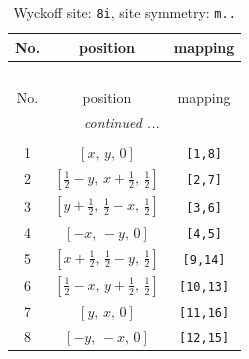 \documentclass[fleqn,8pt]{jsarticle}
\begin{document}
\renewcommand{\arraystretch}{1.2}
\begin{longtable}{ccc}
\caption{Wyckoff site: {\tt 8i}, site symmetry: {\tt m..}}
 \\
 \hline \hline
No. & position & mapping \\ \hline \endfirsthead

\multicolumn{2}{l}{\tablename\ \thetable{}} \\
 \hline \hline
No. & position & mapping \\ \hline \endhead

 \hline \hline
\multicolumn{2}{r}{\footnotesize\it continued ...} \\ \endfoot

 \hline \hline
\multicolumn{2}{r}{} \\ \endlastfoot

1 & $\left[ x,\, y,\, 0 \right]$ & {\tt [1,8]} \\ \hline
2 & $\left[ \frac{1}{2} - y,\, x + \frac{1}{2},\, \frac{1}{2} \right]$ & {\tt [2,7]} \\ \hline
3 & $\left[ y + \frac{1}{2},\, \frac{1}{2} - x,\, \frac{1}{2} \right]$ & {\tt [3,6]} \\ \hline
4 & $\left[ - x,\, - y,\, 0 \right]$ & {\tt [4,5]} \\ \hline
5 & $\left[ x + \frac{1}{2},\, \frac{1}{2} - y,\, \frac{1}{2} \right]$ & {\tt [9,14]} \\ \hline
6 & $\left[ \frac{1}{2} - x,\, y + \frac{1}{2},\, \frac{1}{2} \right]$ & {\tt [10,13]} \\ \hline
7 & $\left[ y,\, x,\, 0 \right]$ & {\tt [11,16]} \\ \hline
8 & $\left[ - y,\, - x,\, 0 \right]$ & {\tt [12,15]} \\
\end{longtable}
\renewcommand{\arraystretch}{1.2}
\end{document}
